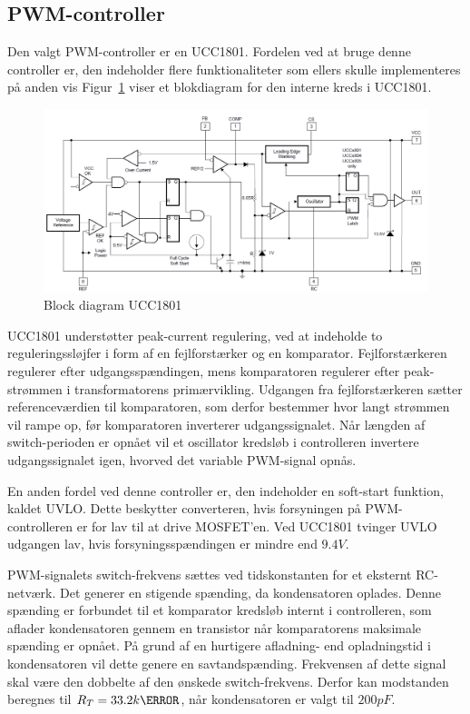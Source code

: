 
\subsection{PWM-controller}
Den valgt PWM-controller er en UCC1801\cite{UCC1801}. Fordelen ved at bruge denne controller er, den indeholder flere funktionaliteter som ellers skulle implementeres på anden vis Figur~\ref{fig:PWM_diagram} viser et blokdiagram for den interne kreds i UCC1801.

\begin{figure}[H]
	\centering
	\includegraphics[width=1\linewidth]{../Dokumentation/tex/2iteration/billeder/PWM_block_diagram.png}
	\caption{Block diagram UCC1801}
	\label{fig:PWM_diagram}
\end{figure}

\noindent UCC1801 understøtter peak-current regulering, ved at indeholde to reguleringssløjfer i form af en fejlforstærker og en komparator. Fejlforstærkeren regulerer efter udgangsspændingen, mens komparatoren regulerer efter peak-strømmen i transformatorens primærvikling. Udgangen fra fejlforstærkeren sætter referenceværdien til komparatoren, som derfor bestemmer hvor langt strømmen vil rampe op, før komparatoren inverterer udgangssignalet. Når længden af switch-perioden er opnået vil et oscillator kredsløb i controlleren invertere udgangssignalet igen, hvorved det variable PWM-signal opnås. 

En anden fordel ved denne controller er, den indeholder en soft-start funktion, kaldet UVLO. Dette beskytter converteren, hvis forsyningen på PWM-controlleren er for lav til at drive MOSFET'en. Ved UCC1801 tvinger UVLO udgangen lav, hvis forsyningsspændingen er mindre end $9.4V$.

PWM-signalets switch-frekvens sættes ved tidskonstanten for et eksternt RC-netværk. Det generer en stigende spænding, da kondensatoren oplades. Denne spænding er forbundet til et komparator kredsløb internt i controlleren, som aflader kondensatoren gennem en transistor når komparatorens maksimale spænding er opnået. På grund af en hurtigere afladning- end opladningstid i kondensatoren vil dette genere en savtandspænding. Frekvensen af dette signal skal være den dobbelte af den ønskede switch-frekvens. Derfor kan modstanden beregnes til $R_T = 33.2k\ohm$, når kondensatoren er valgt til $200pF$.

